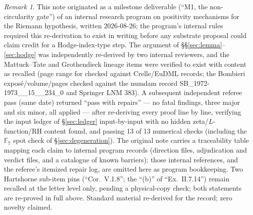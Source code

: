 \documentclass[11pt]{article}
\theoremstyle{definition}
\theoremstyle{remark}
\newtheorem*{remark*}{Remark}
\begin{document}
\begin{remark*}
This note originated as a milestone deliverable (``M1, the non-circularity gate'') of an
internal research program on positivity mechanisms for the Riemann hypothesis, written
2026-08-26; the program's internal rules required this re-derivation to exist in writing
before any substrate proposal could claim credit for a Hodge-index-type step. The argument
of \S\S\ref{sec:lemma}--\ref{sec:hodge} was independently re-derived by two internal
reviewers, and the Mattuck--Tate and Grothendieck lineage items were verified to exist with
content as recalled (page range for \cite{Grothendieck} checked against Crelle/EuDML
records; the Bombieri expos\'e/volume/pages checked against the numdam record
SB\_1972-1973\_\_15\_\_234\_0 and Springer LNM 383). A subsequent independent referee pass
(same date) returned ``pass with repairs'' --- no fatal findings, three major and six minor,
all applied --- after re-deriving every proof line by line, verifying the input ledger of
\S\ref{sec:ledger} input-by-input with no hidden zeta/$L$-function/RH content found, and
passing 13 of 13 numerical checks (including the $\mathbb{F}_7$ spot check of
\S\ref{sec:degeneration}). The original note carries a traceability table mapping each
claim to internal program records (direction files, adjudication and verdict files, and a
catalogue of known barriers); those internal references, and the referee's itemized repair
log, are omitted here as program bookkeeping. Two Hartshorne sub-item pins
(``Cor.~V.1.8''; the ``(b)'' of ``Ex.~II.7.14'') remain recalled at the letter level only,
pending a physical-copy check; both statements are re-proved in full above. Standard
material re-derived for the record; zero novelty claimed.
\end{remark*}
\end{document}

